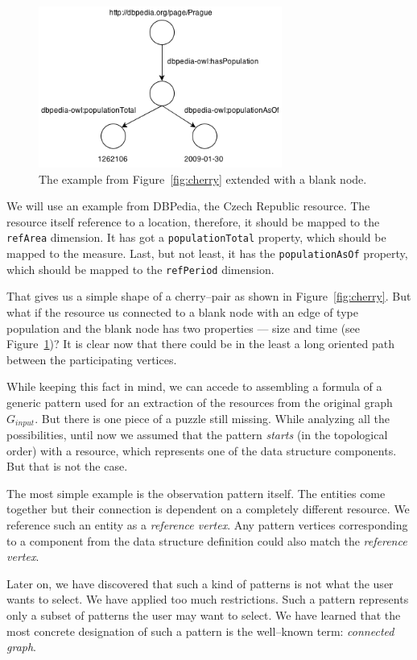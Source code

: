 \begin{figure}
	\centering
	\includegraphics[width=80mm]{images/cherry_blank.png}
	\caption{The example from Figure~\ref{fig:cherry} extended with a blank node.}
	\label{fig:cherry-blank}
\end{figure}

We will use an example from DBPedia, 
the Czech Republic resource. The resource itself reference to a location, 
therefore, it should be mapped to the \verb|refArea| dimension. It has got a 
\verb|populationTotal| property, which should be mapped to the measure. Last, but not 
least, it has the \verb|populationAsOf| property, which should be mapped to the 
\verb|refPeriod| dimension.

That gives us a simple shape of a cherry--pair as shown in
Figure~\ref{fig:cherry}. But what 
if the resource us connected to a blank node with an edge of type 
population and the blank node has two properties --- size and time
(see Figure~\ref{fig:cherry-blank})?
It is clear now that there could be in the least a long oriented path between the participating 
vertices.

While keeping this fact in mind, we can accede to assembling a formula of a generic pattern used for an extraction of the resources from the original graph $G_{input}$. But 
there is one piece of a puzzle still missing. While analyzing all the
possibilities, until now we assumed that the pattern \emph{starts} (in the topological order)
with a resource, which represents one of the data structure components. But that is not  
the case.

The most simple example is the observation pattern itself. The 
entities come together but their connection is dependent on a completely 
different resource. We reference such an entity
as a \emph{reference vertex}. Any pattern vertices corresponding to a component from the 
data structure definition could also match the \emph{reference vertex}.

Later on, we have discovered that such a kind of patterns is not what the user 
wants to select. We have applied too much restrictions. Such a pattern
represents only a subset of patterns the user may want to select. We have learned
that the most concrete designation of such a pattern is the well--known term:
\emph{connected graph}.

